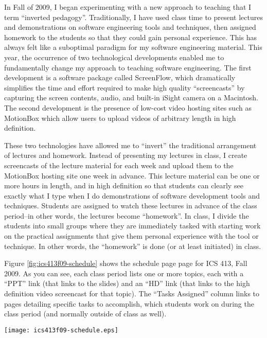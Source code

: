 \documentclass[11pt]{article}
\begin{document}
In Fall of 2009, I began experimenting with a new approach to teaching that
I term ``inverted pedagogy''.  Traditionally, I have used class time to
present lectures and demonstrations on software engineering tools and
techniques, then assigned homework to the students so that they could gain
personal experience.  This has always felt like a suboptimal paradigm for
my software engineering material.  This year, the occurrence of two
technological developments enabled me to fundamentally change my approach
to teaching software engineering. The first development is a software
package called ScreenFlow, which dramatically simplifies the time and
effort required to make high quality ``screencasts'' by capturing the
screen contents, audio, and built-in iSight camera on a Macintosh.  The
second development is the presence of low-cost  video
hosting sites such as MotionBox which allow users to upload videos of
arbitrary length in high definition.  

These two technologies have allowed me to ``invert'' the traditional
arrangement of lectures and homework.  Instead of presenting my lectures in
class, I create screencasts of the lecture material for each week and
upload them to the MotionBox hosting site one week in advance.  This
lecture material can be one or more hours in length, and in high definition
so that students can clearly see exactly what I type when I do demonstrations of
software development tools and techniques.  Students are assigned to watch
these lectures in advance of the class period--in other words, the lectures
become ``homework''.   In class, I divide the students into small groups
where they are immediately tasked with starting work on the practical
assignments that give them personal experience with the tool or technique.
In other words, the ``homework'' is done (or at least initiated)  in class.

Figure \ref{fig:ics413f09-schedule} shows the schedule page page for ICS
413, Fall 2009.  As you can see, each class period lists one or more
topics, each with a ``PPT'' link (that links to the slides) and an ``HD''
link (that links to the high definition video screencast for that topic).
The ``Tasks Assigned'' column links to pages detailing specific tasks to
accomplish, which students work on during the class period (and normally
outside of class as well). 


\begin{figure*}[ht]
  \center
  \texttt{[image: ics413f09-schedule.eps]}
  \caption{ICS 413, Fall 2009 Schedule Page}
  \label{fig:ics413f09-schedule}
\end{figure*}  
\end{document}
